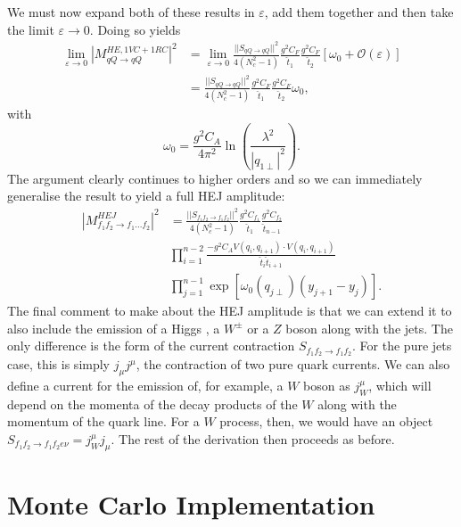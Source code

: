 We must now expand both of these results in $\varepsilon$, add them together and then take the limit $\varepsilon \to 0$. Doing so yields
\begin{equation}
\begin{split}
\lim_{\varepsilon \to 0} |M_{qQ \to qQ}^{HE, 1VC+1RC}|^2 &= \lim_{\varepsilon \to 0} \frac{||S_{qQ \to qQ}||^2}{4 (N_c^2 - 1)}\frac{g^2 C_{F}}{\hat{t}_1} \frac{g^2 C_{F}}{\hat{t}_2} \left[\omega_0 + \mathcal{O}(\varepsilon) \right] \\
&= \frac{||S_{qQ \to qQ}||^2}{4 (N_c^2 - 1)}\frac{g^2 C_{F}}{\hat{t}_1} \frac{g^2 C_{F}}{\hat{t}_2} \omega_0,
\end{split}
\end{equation}
with
\begin{equation}
\omega_0 = \frac{g^2 C_A}{4 \pi^2} \ln \left( \frac{\lambda^2}{|q_{1 \perp}|^2}\right).
\label{eqn:omega}
\end{equation}
The argument clearly continues to higher orders and so we can immediately generalise the result to yield a full HEJ amplitude:
\begin{equation}
\begin{split}
|M_{f_1f_2 \to f_1...f_2}^{HEJ}|^2 &= \frac{||S_{f_1 f_2 \to f_1 f_2}||^2}{4 (N_c^2 - 1)}\frac{g^2 C_{f_1}}{\hat{t}_1} \frac{g^2 C_{f_2}}{\hat{t}_{n-1}} \\
& \prod_{i=1}^{n-2} \frac{-g^2 C_A V(q_{i}, q_{i+1}) \cdot V(q_{i}, q_{i+1})}{\hat{t}_{i} \hat{t}_{i+1}}  \\
& \prod_{j =1}^{n-1} \exp \left[ \omega_0(q_{j \perp})(y_{j+1} - y_j) \right].
\end{split}
\end{equation}
The final comment to make about the HEJ amplitude is that we can extend it to also include the emission of a Higgs \cite{Andersen2011a}, a $W^{\pm}$ \cite{Andersen2012} or a $Z$ boson \cite{Andersen2016} along with the jets. The only difference is the form of the current contraction $S_{f_1f_2 \to f_1 f_2}$. For the pure jets case, this is simply $j_\mu j^\mu$, the contraction of two pure quark currents. We can also define a current for the emission of, for example, a $W$ boson as $j^\mu_W$, which will depend on the momenta of the decay products of the $W$ along with the momentum of the quark line. For a $W$ process, then, we would have an object $S_{f_1 f_2 \to f_1 f_2 e \nu} = j^\mu_W j_\mu$. The rest of the derivation then proceeds as before. 

\section{Monte Carlo Implementation}

